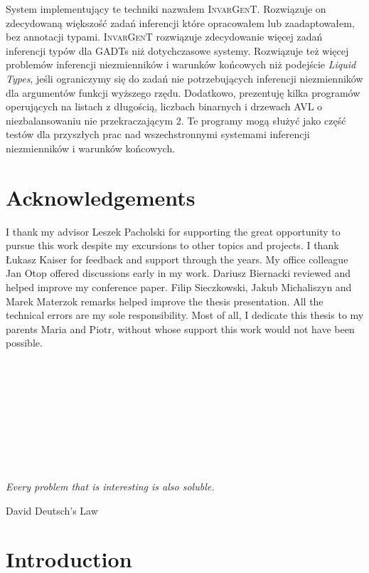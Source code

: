 \documentclass{article}
\newcommand{\tmem}[1]{{\em #1\/}}
\newcommand{\tmname}[1]{\textsc{#1}}
\begin{document}
System implementuj{\k a}cy te techniki nazwa{\l}em {\tmname{InvarGenT}}.
Rozwi{\k a}zuje on zdecydowan{\k a} wi{\k e}kszo{\'s}{\'c} zada{\'n}
inferencji kt{\'o}re opracowa{\l}em lub zaadaptowa{\l}em, bez annotacji
typami. {\tmname{InvarGenT}} rozwi{\k a}zuje zdecydowanie wi{\k e}cej
zada{\'n} inferencji typ{\'o}w dla GADTs ni{\.z} dotychczasowe systemy.
Rozwi{\k a}zuje te{\.z} wi{\k e}cej problem{\'o}w inferencji niezmiennik{\'o}w
i warunk{\'o}w ko{\'n}cowych ni{\.z} podej{\'s}cie {\tmem{Liquid Types}},
je{\'s}li ograniczymy si{\k e} do zada{\'n} nie potrzebuj{\k a}cych inferencji
niezmiennik{\'o}w dla argument{\'o}w funkcji wy{\.z}szego rz{\k e}du.
Dodatkowo, prezentuj{\k e} kilka program{\'o}w operuj{\k a}cych na listach z
d{\l}ugo{\'s}ci{\k a}, liczbach binarnych i drzewach AVL o niezbalansowaniu
nie przekraczaj{\k a}cym 2. Te programy mog{\k a} s{\l}u{\.z}y{\'c} jako cz{\k
e}{\'s}{\'c} test{\'o}w dla przysz{\l}ych prac nad wszechstronnymi systemami
inferencji niezmiennik{\'o}w i warunk{\'o}w ko{\'n}cowych.

\chapter*{Acknowledgements}

I thank my advisor Leszek Pacholski for supporting the great opportunity to
pursue this work despite my excursions to other topics and projects. I thank
{\L}ukasz Kaiser for feedback and support through the years. My office
colleague Jan Otop offered discussions early in my work. Dariusz Biernacki
reviewed and helped improve my conference paper. Filip Sieczkowski, Jakub
Michaliszyn and Marek Materzok remarks helped improve the thesis presentation.
All the technical errors are my sole responsibility. Most of all, I dedicate
this thesis to my parents Maria and Piotr, without whose support this work
would not have been possible.

\

\

\

\

\

\begin{flushright}
  {\tmem{Every problem that is interesting is also soluble.}}
  
  David Deutsch's Law
\end{flushright}

{\tableofcontents}

\chapter{Introduction}\label{Intro}
\end{document}
